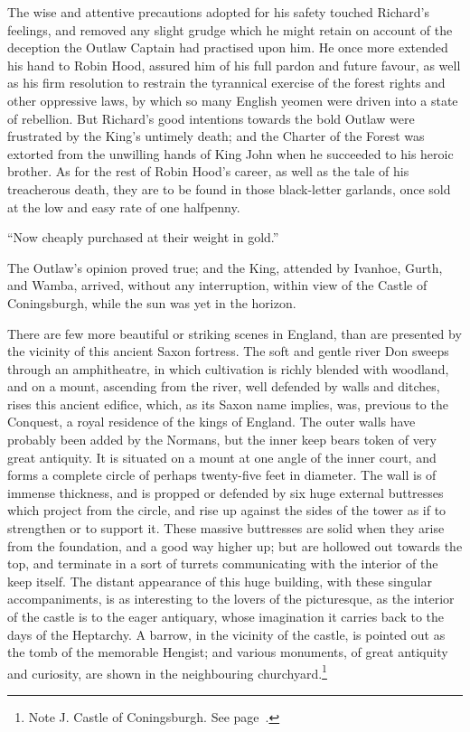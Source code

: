 The wise and attentive precautions adopted for his safety touched
Richard's feelings, and removed any slight grudge which he might retain
on account of the deception the Outlaw Captain had practised upon him.
He once more extended his hand to Robin Hood, assured him of his full
pardon and future favour, as well as his firm resolution to restrain the
tyrannical exercise of the forest rights and other oppressive laws, by
which so many English yeomen were driven into a state of rebellion. But
Richard's good intentions towards the bold Outlaw were frustrated by the
King's untimely death; and the Charter of the Forest was extorted from
the unwilling hands of King John when he succeeded to his heroic
brother. As for the rest of Robin Hood's career, as well as the tale of
his treacherous death, they are to be found in those black-letter
garlands, once sold at the low and easy rate of one halfpenny.

``Now cheaply purchased at their weight in gold.''

The Outlaw's opinion proved true; and the King, attended by Ivanhoe,
Gurth, and Wamba, arrived, without any interruption, within view of the
Castle of Coningsburgh, while the sun was yet in the horizon.

There are few more beautiful or striking scenes in England, than are
presented by the vicinity of this ancient Saxon fortress. The soft and
gentle river Don sweeps through an amphitheatre, in which cultivation is
richly blended with woodland, and on a mount, ascending from the river,
well defended by walls and ditches, rises this ancient edifice, which,
as its Saxon name implies, was, previous to the Conquest, a royal
residence of the kings of England. The outer walls have probably been
added by the Normans, but the inner keep bears token of very great
antiquity. It is situated on a mount at one angle of the inner court,
and forms a complete circle of perhaps twenty-five feet in diameter. The
wall is of immense thickness, and is propped or defended by six huge
external buttresses which project from the circle, and rise up against
the sides of the tower as if to strengthen or to support it. These
massive buttresses are solid when they arise from the foundation, and a
good way higher up; but are hollowed out towards the top, and terminate
in a sort of turrets communicating with the interior of the keep itself.
The distant appearance of this huge building, with these singular
accompaniments, is as interesting to the lovers of the picturesque, as
the interior of the castle is to the eager antiquary, whose imagination
it carries back to the days of the Heptarchy. A barrow, in the vicinity
of the castle, is pointed out as the tomb of the memorable Hengist; and
various monuments, of great antiquity and curiosity, are shown in the
neighbouring churchyard.\footnote{Note J. Castle of Coningsburgh.
See page~\pageref{noteCXLI}.}

